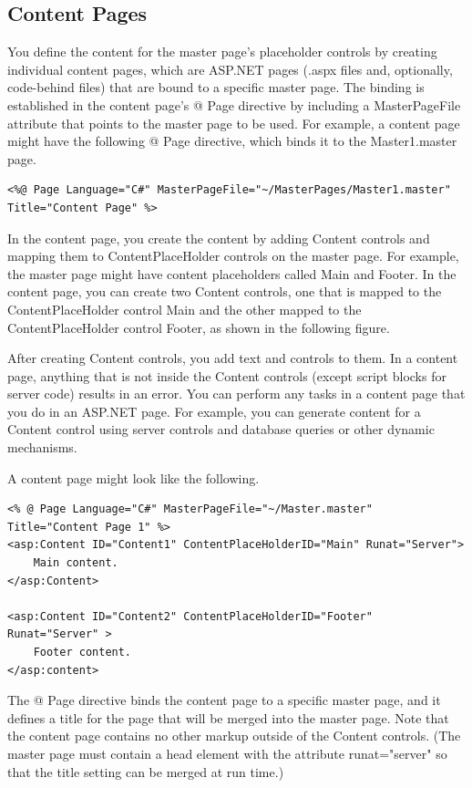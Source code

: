 \subsection{Content Pages}
You define the content for the master page's placeholder controls by creating individual content pages, which are ASP.NET pages (.aspx files and, optionally, code-behind files) that are bound to a specific master page. The binding is established in the content page's @ Page directive by including a MasterPageFile attribute that points to the master page to be used. For example, a content page might have the following @ Page directive, which binds it to the Master1.master page.
\begin{lstlisting}
<%@ Page Language="C#" MasterPageFile="~/MasterPages/Master1.master" Title="Content Page" %>
\end{lstlisting}
In the content page, you create the content by adding Content controls and mapping them to ContentPlaceHolder controls on the master page. For example, the master page might have content placeholders called Main and Footer. In the content page, you can create two Content controls, one that is mapped to the ContentPlaceHolder control Main and the other mapped to the ContentPlaceHolder control Footer, as shown in the following figure.

After creating Content controls, you add text and controls to them. In a content page, anything that is not inside the Content controls (except script blocks for server code) results in an error. You can perform any tasks in a content page that you do in an ASP.NET page. For example, you can generate content for a Content control using server controls and database queries or other dynamic mechanisms.

A content page might look like the following.
\begin{lstlisting}
<% @ Page Language="C#" MasterPageFile="~/Master.master" Title="Content Page 1" %>
<asp:Content ID="Content1" ContentPlaceHolderID="Main" Runat="Server">
	Main content.
</asp:Content>

<asp:Content ID="Content2" ContentPlaceHolderID="Footer" Runat="Server" >
	Footer content.
</asp:content>
\end{lstlisting}
The @ Page directive binds the content page to a specific master page, and it defines a title for the page that will be merged into the master page. Note that the content page contains no other markup outside of the Content controls. (The master page must contain a head element with the attribute runat="server" so that the title setting can be merged at run time.)

